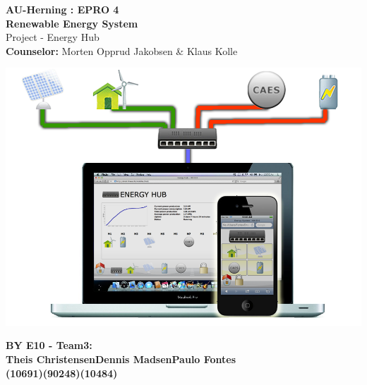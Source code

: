 \begin{centering}
\thispagestyle{empty} %
\begin{center}
\textbf{\Huge {AU-Herning : EPRO 4\\[0.1cm]Renewable Energy System}}\\
\huge {Project - Energy Hub}\\ \vspace{0.4cm}
\large{\textbf{Counselor:} Morten Opprud Jakobsen \& Klaus Kolle}\\ \vspace{0.0cm}
\end{center}

\centering
\includegraphics[width=1\textwidth]{images/frontpage.jpg}
 \end{centering}
 
 
\begin{center}
\vspace{0.4cm}
\Large{\textbf{BY E10 - Team3: \\ \vspace{0.2cm}Theis Christensen\hspace{1.5cm}Dennis Madsen\hspace{1.5cm}Paulo Fontes}
\\\textbf{(10691)\hspace{3.7cm}(90248)\hspace{3.7cm}(10484)}}
\end{center}

\newpage
\thispagestyle{empty}
\mbox{}